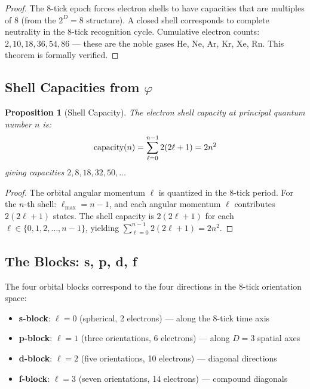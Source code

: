 \documentclass[12pt,a4paper]{article}
\newtheorem{proposition}[theorem]{Proposition}
\theoremstyle{definition}
\theoremstyle{remark}
\begin{document}
\begin{proof}
The 8-tick epoch forces electron shells to have capacities that 
are multiples of 8 (from the $2^D = 8$ structure). A closed shell corresponds to 
complete neutrality in the 8-tick recognition cycle.
Cumulative electron counts: $2, 10, 18, 36, 54, 86$ — these are the noble gases He, Ne, Ar, Kr, Xe, Rn.
This theorem is formally verified.
\end{proof}

\subsection{Shell Capacities from $\varphi$}

\begin{proposition}[Shell Capacity]
The electron shell capacity at principal quantum number $n$ is:
\begin{equation}
\textup{capacity}(n) = \sum_{\ell=0}^{n-1} 2(2\ell + 1) = 2n^2
\end{equation}
giving capacities $2, 8, 18, 32, 50, \ldots$
\end{proposition}

\begin{proof}
The orbital angular momentum $\ell$ is quantized in the 8-tick 
period. For the $n$-th shell: $\ell_\mathrm{max} = n - 1$, and each angular momentum 
$\ell$ contributes $2(2\ell + 1)$ states. The shell capacity is $2(2\ell + 1)$ for each 
$\ell \in \{0, 1, 2, \ldots, n-1\}$, yielding $\sum_{\ell=0}^{n-1} 2(2\ell+1) = 2n^2$.
\end{proof}

\subsection{The Blocks: s, p, d, f}

The four orbital blocks correspond to the four directions in the 8-tick orientation space:
\begin{itemize}
\item \textbf{s-block}: $\ell = 0$ (spherical, 2 electrons) — along the 8-tick time axis
\item \textbf{p-block}: $\ell = 1$ (three orientations, 6 electrons) — along $D = 3$ spatial axes
\item \textbf{d-block}: $\ell = 2$ (five orientations, 10 electrons) — diagonal directions
\item \textbf{f-block}: $\ell = 3$ (seven orientations, 14 electrons) — compound diagonals
\end{itemize}
\end{document}
